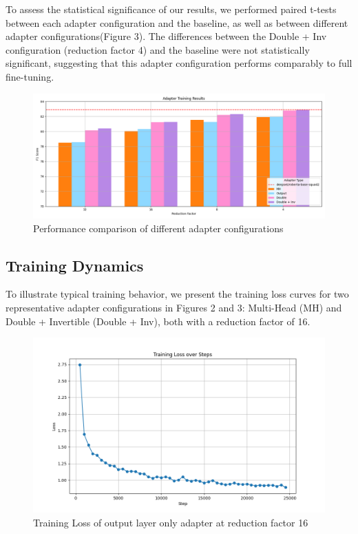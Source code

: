 \documentclass[conference]{IEEEtran}
\begin{document}
To assess the statistical significance of our results, we performed paired t-tests between each adapter configuration and the baseline, as well as between different adapter configurations(Figure 3). The differences between the Double + Inv configuration (reduction factor 4) and the baseline were not statistically significant, suggesting that this adapter configuration performs comparably to full fine-tuning.

\begin{figure}
    \centering
    \includegraphics[width=1.0\linewidth]{images/performance_comparison.png}
    \caption{Performance comparison of different adapter configurations}
    \label{fig:enter-label}
\end{figure}


\subsection{Training Dynamics}

To illustrate typical training behavior, we present the training loss curves for two representative adapter configurations in Figures 2 and 3: Multi-Head (MH) and Double + Invertible (Double + Inv), both with a reduction factor of 16.

\begin{figure}
    \centering
    \includegraphics[width=1.0\linewidth]{images/loss_seq_bn_default.png}
    \caption{Training Loss of output layer only adapter at reduction factor 16}
    \label{fig:Training loss of output layer only adapter at reduction factor 16}
\end{figure}
\end{document}
